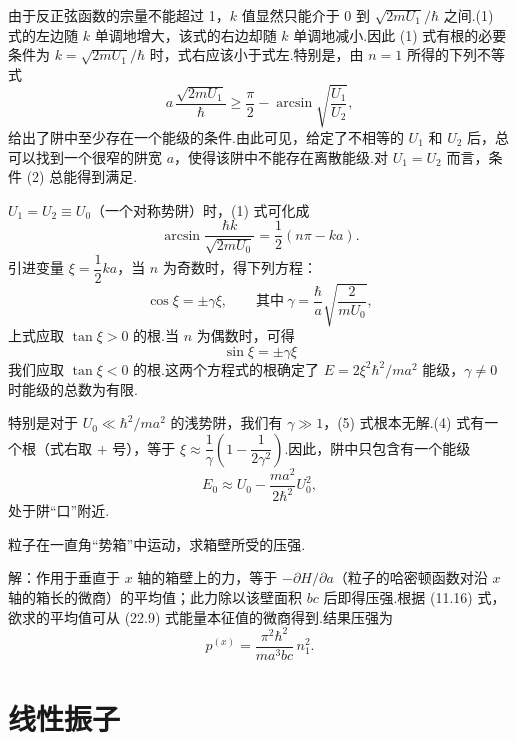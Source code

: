 \begin{xiti}
由于反正弦函数的宗量不能超过 1，$k$ 值显然只能介于 0 到 $\sqrt{2mU_1}/\hbar$ 之间.(1) 式的左边随 $k$ 单调地增大，该式的右边却随 $k$ 单调地减小.因此 (1) 式有根的必要条件为 $k=\sqrt{2mU_1}/\hbar$ 时，式右应该小于式左.特别是，由 $n=1$ 所得的下列不等式
\begin{equation*}
  a\,\frac{\sqrt{2mU_1}}{\hbar}\geqslant\frac{\pi}{2}
  -\arcsin\sqrt{\frac{U_1}{U_2}},
\end{equation*}
给出了阱中至少存在一个能级的条件.由此可见，给定了不相等的 $U_1$ 和 $U_2$ 后，总可以找到一个很窄的阱宽 $a$，使得该阱中不能存在离散能级.对 $U_1=U_2$ 而言，条件 (2) 总能得到满足.

$U_1=U_2\equiv U_0$（一个对称势阱）时，(1) 式可化成
\begin{equation*}
  \arcsin\frac{\hbar k}{\sqrt{2mU_0}}=\frac{1}{2}\left(n\pi-ka\right).
\end{equation*}
引进变量 $\xi=\dfrac{1}{2}ka$，当 $n$ 为奇数时，得下列方程：
\begin{equation*}
  \cos\xi=\pm\gamma\xi,
  \qquad\text{其中}\ \gamma=\frac{\hbar}{a}\sqrt{\frac{2}{mU_0}},
\end{equation*}
上式应取 $\tan\xi>0$ 的根.当 $n$ 为偶数时，可得
\begin{equation*}
  \sin\xi=\pm\gamma\xi
\end{equation*}
我们应取 $\tan\xi<0$ 的根.这两个方程式的根确定了 $E=2\xi^2\hbar^2/ma^2$ 能级，$\gamma\neq 0$ 时能级的总数为有限.

特别是对于 $U_0\ll\hbar^2/ma^2$ 的浅势阱，我们有 $\gamma\gg 1$，(5) 式根本无解.(4) 式有一个根（式右取 $+$ 号），等于 $\xi\approx\dfrac{1}{\gamma}\left(1-\dfrac{1}{2\gamma^2}\right)$.因此，阱中只包含有一个能级
\begin{equation*}
  E_0\approx U_0-\frac{ma^2}{2\hbar^2}U_0^2,
\end{equation*}
处于阱“口”附近.

\quad 粒子在一直角“势箱”中运动，求箱壁所受的压强.

解：作用于垂直于 $x$ 轴的箱壁上的力，等于 $-\partial H/\partial a$（粒子的哈密顿函数对沿 $x$ 轴的箱长的微商）的平均值；此力除以该壁面积 $bc$ 后即得压强.根据 (11.16) 式，欲求的平均值可从 (22.9) 式能量本征值的微商得到.结果压强为
\begin{equation*}
  p^{(x)}=\frac{\pi^2\hbar^2}{ma^3bc}\,n_1^2.
\end{equation*}

\end{xiti}

\section{线性振子}

